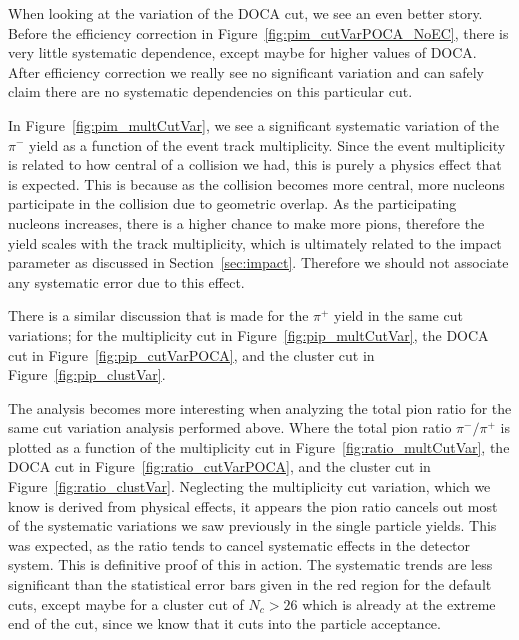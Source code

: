 When looking at the variation of the DOCA cut, we see an even better story. Before the efficiency correction in Figure~\ref{fig:pim_cutVarPOCA_NoEC}, there is very little systematic dependence, except maybe for higher values of DOCA. After efficiency correction we really see no significant variation and can safely claim there are no systematic dependencies on this particular cut. 

In Figure~\ref{fig:pim_multCutVar}, we see  a significant systematic variation of the $\pi^-$ yield as a function of the event track multiplicity. Since the event multiplicity is related to how central of a collision we had, this is purely a physics effect that is expected. This is because as the collision becomes more central, more nucleons participate in the collision due to geometric overlap. As the participating nucleons increases, there is a higher chance to make more pions, therefore the yield scales with the track multiplicity, which is ultimately related to the impact parameter as discussed in Section~\ref{sec:impact}. Therefore we should not associate any systematic error due to this effect.

There is a similar discussion that is made for the $\pi^+$ yield in the same cut variations; for the multiplicity cut in Figure~\ref{fig:pip_multCutVar}, the DOCA cut in Figure~\ref{fig:pip_cutVarPOCA}, and the cluster cut in Figure~\ref{fig:pip_clustVar}.


The analysis becomes more interesting when analyzing the total pion ratio for the same cut variation analysis performed above. Where the total pion ratio $\pi^-/\pi^+$ is plotted as a function of the multiplicity cut in Figure~\ref{fig:ratio_multCutVar}, the DOCA cut in Figure~\ref{fig:ratio_cutVarPOCA}, and the cluster cut in Figure~\ref{fig:ratio_clustVar}. Neglecting the multiplicity cut variation, which we know is derived from physical effects, it appears the pion ratio cancels out most of the systematic variations we saw previously in the single particle yields. This was expected, as the ratio tends to cancel systematic effects in the detector system. This is definitive proof of this in action. The systematic trends are less significant than the statistical error bars given in the red region for the default cuts, except maybe for a cluster cut of $N_c > 26$ which is already at the extreme end of the cut, since we know that it cuts into the particle acceptance.  



 

